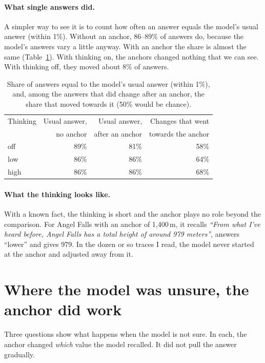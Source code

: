 \documentclass[11pt,a4paper]{article}
\newcommand{\quoteit}[1]{\emph{\enquote{#1}}}
\begin{document}
\paragraph{What single answers did.} A simpler way to see it is to count how often an answer equals the model's usual answer (within 1\%). Without an anchor, 86--89\% of answers do, because the model's answers vary a little anyway. With an anchor the share is almost the same (Table~\ref{tab:same}). With thinking on, the anchors changed nothing that we can see. With thinking off, they moved about 8\% of answers.

\begin{table}[ht]
\centering\small
\begin{tabular}{lrrr}
\toprule
Thinking & Usual answer, & Usual answer, & Changes that went \\
         & no anchor & after an anchor & towards the anchor \\
\midrule
off  & 89\% & 81\% & 58\% \\
low  & 86\% & 86\% & 64\% \\
high & 86\% & 86\% & 68\% \\
\bottomrule
\end{tabular}
\caption{Share of answers equal to the model's usual answer (within 1\%), and, among the answers that did change after an anchor, the share that moved towards it (50\% would be chance).}
\label{tab:same}
\end{table}

\paragraph{What the thinking looks like.} With a known fact, the thinking is short and the anchor plays no role beyond the comparison. For Angel Falls with an anchor of 1,400\,m, it recalls \quoteit{From what I've heard before, Angel Falls has a total height of around 979 meters}, answers \enquote{lower} and gives 979. In the dozen or so traces I read, the model never started at the anchor and adjusted away from it.

\section{Where the model was unsure, the anchor did work}
\label{sec:unsure}

Three questions show what happens when the model is not sure. In each, the anchor changed \emph{which} value the model recalled. It did not pull the answer gradually.
\end{document}
